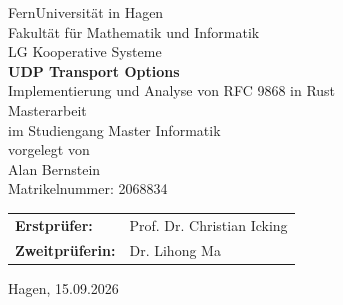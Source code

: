 \documentclass[
    12pt,           %
    a4paper,        %
    oneside,        %
    openany         %
]{report}
\newcommand{\thesistitle}{UDP Transport Options}
\newcommand{\thesissubtitle}{Implementierung und Analyse von RFC 9868 in Rust}
\newcommand{\thesisauthor}{Alan Bernstein}
\newcommand{\thesismatrikel}{2068834}
\newcommand{\thesissupervisor}{Prof. Dr. Christian Icking}
\newcommand{\thesissecondexaminer}{Dr. Lihong Ma}
\newcommand{\thesisuniversity}{FernUniversität in Hagen}
\newcommand{\thesisfaculty}{Fakultät für Mathematik und Informatik}
\newcommand{\thesisdepartment}{LG Kooperative Systeme}
\newcommand{\thesisprogram}{Master Informatik}
\newcommand{\thesissubmissiondate}{15.09.2026}
\begin{document}
\pagestyle{plain}

\hypersetup{pageanchor=false}
\begin{titlepage}
    \centering
    \vspace*{1cm}
    {\large \thesisuniversity}\\[0.3cm]
    {\large \thesisfaculty}\\[0.3cm]
    {\large \thesisdepartment}\\[2cm]
    {\LARGE \bfseries \thesistitle}\\[0.5cm]
    {\large \thesissubtitle}\\[1.5cm]
    {\Large Masterarbeit}\\[0.5cm]
    {\large im Studiengang \thesisprogram}\\[2cm]
    {\large vorgelegt von}\\[0.3cm]
    {\Large \thesisauthor}\\[0.3cm]
    {\normalsize Matrikelnummer: \thesismatrikel}
    \vfill
    \begin{tabular}{ll}
        \textbf{Erstprüfer:} & \thesissupervisor \\[0.3cm]
        \textbf{Zweitprüferin:} & \thesissecondexaminer \\[0.3cm]
    \end{tabular}
    \vfill
    {\large Hagen, \thesissubmissiondate}
\end{titlepage}
\hypersetup{pageanchor=true}

\tableofcontents

\listoffigures
{}

\listoftables
{}

\glsaddall
\printglossary[type=\acronymtype, title=Abkürzungsverzeichnis]

\clearpage
{}
\pagestyle{plain}








\end{document}

